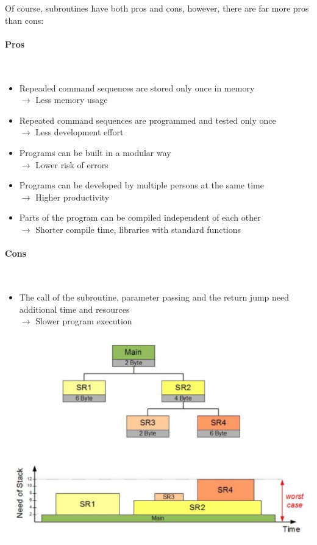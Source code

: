 \documentclass[a4paper, 11pt, nofootinbib]{book}
\begin{document}
\newpage

Of course, subroutines have both pros and cons, however, there are far more pros than cons:
\begin{multicols}{2}
	\paragraph{Pros} \mbox{}\\
	\begin{itemize}
		\item Repeaded command sequences are stored only once in memory \\
			$\rightarrow$ Less memory usage
		\item Repeated command sequences are programmed and tested only once \\
			$\rightarrow$ Less development effort
		\item Programs can be built in a modular way \\
			$\rightarrow$ Lower risk of errors
		\item Programs can be developed by multiple persons at the same time \\
			$\rightarrow$ Higher productivity
		\item Parts of the program can be compiled independent of each other \\
			$\rightarrow$ Shorter compile time, libraries with standard functions
	\end{itemize}
\columnbreak
	\paragraph{Cons}\mbox{}\\
	\begin{itemize}
		\item The call of the subroutine, parameter passing and the return jump need additional time and resources\\
			$\rightarrow$ Slower program execution
	\end{itemize}
		\includegraphics[keepaspectratio=true,height=13\baselineskip]{stack_consumption.jpg}
		\label{fig:stack_consumption}
\end{multicols}
\end{document}
